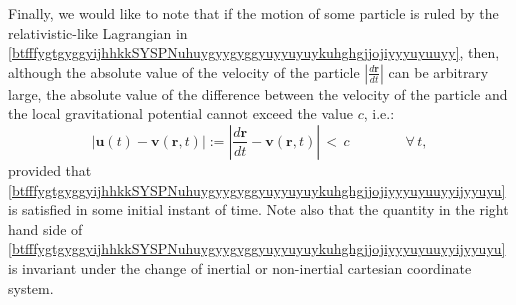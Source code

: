 \documentclass{article}
\theoremstyle{definition}
\theoremstyle{remark}
\renewcommand{\vec}[1]{\mathbf{#1}}
\newcommand{\er}{\eqref}
\newcommand{\er}{\eqref}
\begin{document}
Finally, we would like to note that if the motion of some particle
is ruled by the relativistic-like Lagrangian in
\er{btfffygtgyggyijhhkkSYSPNuhuygyygyggyuyyuyuykuhghgjjojiyyyuyuuyy},
then, although the absolute value of the velocity of the particle
$\left|\frac{d\vec r}{dt}\right|$ can be arbitrary large, the
absolute value of the difference between the velocity of the
particle and the local gravitational potential cannot exceed the
value $c$, i.e.:
\begin{equation}\label{btfffygtgyggyijhhkkSYSPNuhuygyygyggyuyyuyuykuhghgjjojiyyyuyuuyyijyyuyu}
\left|\vec u(t)-\vec v(\vec r,t)\right|:=\left|\frac{d\vec
r}{dt}-\vec v(\vec r,t)\right|\,<\,c\quad\quad\quad\quad\forall\, t,
\end{equation}
provided that
\er{btfffygtgyggyijhhkkSYSPNuhuygyygyggyuyyuyuykuhghgjjojiyyyuyuuyyijyyuyu}
is satisfied in some initial instant of time. Note also that the
quantity in the right hand side of
\er{btfffygtgyggyijhhkkSYSPNuhuygyygyggyuyyuyuykuhghgjjojiyyyuyuuyyijyyuyu}
is invariant under the change of inertial or non-inertial cartesian
coordinate system.
\end{document}
